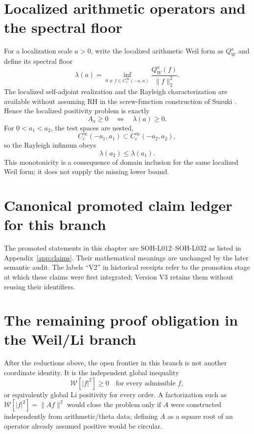 \section{Localized arithmetic operators and the spectral floor}

For a localization scale $a>0$, write the localized arithmetic Weil form as $Q_W^a$ and define its spectral floor
\begin{equation}
 \lambda(a)=
 \inf_{0\ne f\in C_c^\infty(-a,a)}
 \frac{Q_W^a(f)}{\|f\|_2^2}.
 \label{eq:v2-spectral-floor}
\end{equation}
The localized self-adjoint realization and the Rayleigh characterization are available without assuming RH in the screw-function construction of Suzuki \citep{suzuki2026weil}. Hence the localized positivity problem is exactly
\begin{equation}
 A_a\ge0\quad\Longleftrightarrow\quad\lambda(a)\ge0.
 \label{eq:v2-local-operator-positive}
\end{equation}
For $0<a_1<a_2$, the test spaces are nested,
\begin{equation}
 C_c^\infty(-a_1,a_1)\subset C_c^\infty(-a_2,a_2),
\end{equation}
so the Rayleigh infimum obeys
\begin{equation}
 \boxed{\lambda(a_2)\le\lambda(a_1).}
 \label{eq:v2-spectral-floor-monotone}
\end{equation}
This monotonicity is a consequence of domain inclusion for the same localized Weil form; it does not supply the missing lower bound.

\section{Canonical promoted claim ledger for this branch}

The promoted statements in this chapter are SOH-L012--SOH-L032 as listed in Appendix~\ref{app:claims}. Their mathematical meanings are unchanged by the later semantic audit. The labels ``V2'' in historical receipts refer to the promotion stage at which these claims were first integrated; Version V3 retains them without reusing their identifiers.

\section{The remaining proof obligation in the Weil/Li branch}

After the reductions above, the open frontier in this branch is not another coordinate identity. It is the independent global inequality
\begin{equation}
 \boxed{
 \mathcal W[|f|^2]\ge0\quad\text{for every admissible }f,
 }
 \label{eq:v2-final-frontier}
\end{equation}
or equivalently global Li positivity for every order. A factorization such as $\mathcal W[|f|^2]=\|Af\|^2$ would close the problem only if $A$ were constructed independently from arithmetic/theta data; defining $A$ as a square root of an operator already assumed positive would be circular.

